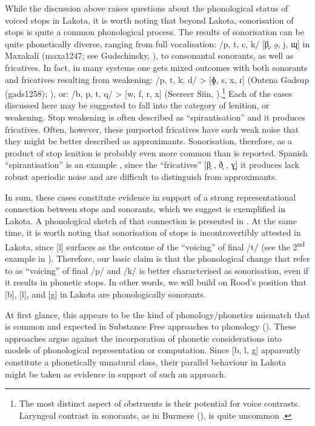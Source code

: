 \documentclass[output=paper]{langscibook}
\begin{document}
While the discussion above raises questions about the phonological status of voiced stops in Lakota, it is worth noting that beyond Lakota, sonorisation of stops is quite a common phonological process. The results of sonorisation can be quite phonetically diverse, ranging from full vocalisation: /p, t, c, k/ [β̞, ə̯, j, ɰ] in Maxakalí (maxa1247; see Gudschinsky, \citealt{GudschinskyPopovich1970,Silva2015,SilvaEtAl2020}), to consonantal sonorants, as well as fricatives. In fact, in many systems one gets mixed outcomes with both sonorants and fricatives resulting from weakening: /p, t, k, d/ > [ɸ, s, x, ɾ] (Ontena Gadsup (gads1258); \citealt{FrantzFrantz1966,Frantz1994}), or: /b, p, t, q/ > [w, f, r, x] (Seereer Siin, \citealt{McLaughlin2000}).\footnote{The most distinct aspect of obstruents is their potential for voice contrasts. Laryngeal contrast in sonorants, as in Burmese (\citealt{BhaskararaoLadefoged1991}), is quite uncommon \citep{Maddieson1984}.} Each of the cases discussed here may be suggested to fall into the category of lenition, or weakening. Stop weakening is often described as “spirantisation” and it produces fricatives. Often, however, these purported fricatives have such weak noise that they might be better described as approximants. Sonorisation, therefore, as a product of stop lenition is probably even more common than is reported. Spanish “spirantisation” is an example \citep{Salinas2015}, since the “fricatives” [β̞ , ð̞ , ɣ̞] it produces lack robust aperiodic noise and are difficult to distinguish from approximants.

In sum, these cases constitute evidence in support of a strong representational connection between stops and sonorants, which we suggest is exemplified in Lakota. A phonological sketch of that connection is presented in . At the same time, it is worth noting that sonorisation of stops is incontrovertibly attested in Lakota, since [l] surfaces as the outcome of the “voicing” of final /t/ (see the 2\textsuperscript{nd} example in ). Therefore, our basic claim is that the phonological change that \citet{BlevinsEtAl2020} refer to as “voicing” of final /p/ and /k/ is better characterised as sonorisation, even if it results in phonetic stops. In other words, we will build on Rood’s position that [b], [l], and [g] in Lakota are phonologically sonorants.

At first glance, this appears to be the kind of phonology/phonetics mismatch that is common and expected in Substance Free approaches to phonology (\citealt{HaleReiss2008,Blaho2008,ChabotScheer2019}). These approaches argue against the incorporation of phonetic considerations into models of phonological representation or computation. Since [b, l, g] apparently constitute a phonetically unnatural class, their parallel behaviour in Lakota might be taken as evidence in support of such an approach.
\end{document}
